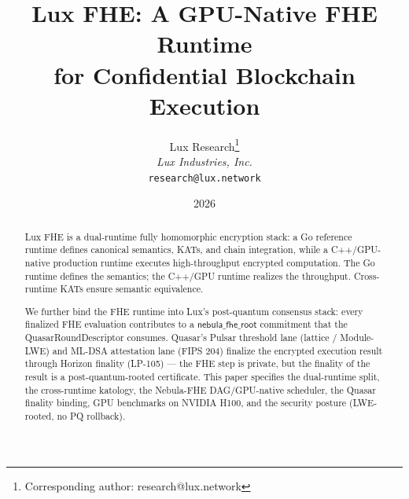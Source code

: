 \documentclass[11pt,a4paper]{article}
\title{\textbf{Lux FHE: A GPU-Native FHE Runtime\\for Confidential Blockchain Execution}}
\author{
Lux Research\thanks{Corresponding author: research@lux.network}\\
\textit{Lux Industries, Inc.}\\
\texttt{research@lux.network}
}
\date{2026}
\begin{document}
\luxcoverpage

\begin{abstract}
Lux FHE is a dual-runtime fully homomorphic encryption stack: a Go reference
runtime defines canonical semantics, KATs, and chain integration, while a
C++/GPU-native production runtime executes high-throughput encrypted
computation. The Go runtime defines the semantics; the C++/GPU runtime
realizes the throughput. Cross-runtime KATs ensure semantic equivalence.

We further bind the FHE runtime into Lux's post-quantum consensus stack:
every finalized FHE evaluation contributes to a $\mathsf{nebula\_fhe\_root}$
commitment that the QuasarRoundDescriptor consumes. Quasar's Pulsar
threshold lane (lattice / Module-LWE) and ML-DSA attestation lane
(FIPS 204) finalize the encrypted execution result through Horizon
finality (LP-105) --- the FHE step is private, but the finality of the
result is a post-quantum-rooted certificate. This paper specifies the
dual-runtime split, the cross-runtime katology, the Nebula-FHE
DAG/GPU-native scheduler, the Quasar finality binding, GPU benchmarks
on NVIDIA H100, and the security posture (LWE-rooted, no PQ rollback).
\end{abstract}










\end{document}
